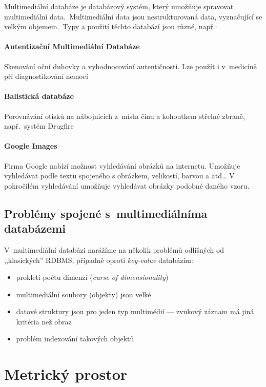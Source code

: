 Multimediální databáze je databázový systém, který umožňuje spravovat
multimediální data\@.~Multimediální data jsou nestrukturovaná data,
vyznačující se velkým objemem\@.~Typy a použití těchto databází
jsou různé, např.:


\paragraph{Autentizační Multimediální Databáze}

Skenování oční duhovky a vyhodnocování autentičnosti\@. Lze použít
i v~medicíně při diagnostikování nemocí


\paragraph{Balistická databáze}

Porovnávání otisků na nábojnicích z~místa činu a kohoutkem střelné
zbraně, např.~systém Drugfire\cite{drugfire}

\paragraph{Google Images}

Firma Google nabízí možnost vyhledávání obrázků na internetu.
Umožňuje vyhledávat podle textu spojeného s obrázkem, velikostí, barvou a atd\ldots{}
V pokročilém vyhledávání umožňuje vyhledávat obrázky podobné daného vzoru\cite{miller2011using}.

\subsection{Problémy spojené s~multimediálníma databázemi}

V~multimediální databázi narážíme na několik problémů odlišných od
,,klasických'' RDBMS, případně oproti \emph{key-value }databázím\cite{no-sql}:
\begin{itemize}
\item prokletí počtu dimenzí (\emph{curse of dimensionality})\cite{Bellman195706}
\item multimediální soubory (objekty) jsou velké
\item datové struktury jsou pro jeden typ multimédií --- zvukový záznam
má jiná kritéria než obraz
\item problém indexování takových objektů
\end{itemize}

\section{Metrický prostor}


